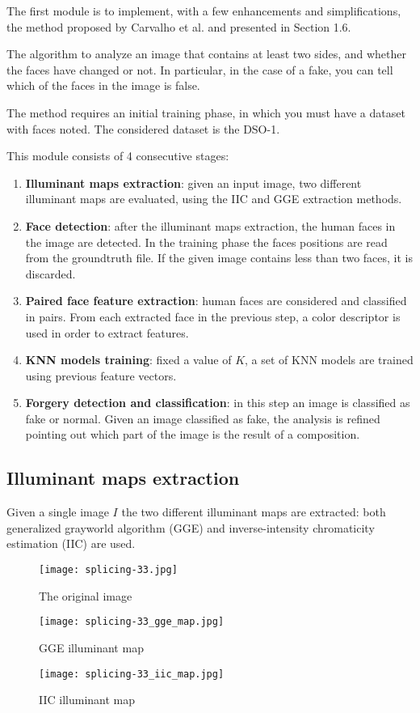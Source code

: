 The first module is to implement, with a few enhancements and simplifications, the method proposed by Carvalho et al. \cite{carvalho2016illuminant} and presented in Section 1.6.

The algorithm to analyze an image that contains at least two sides, and whether the faces have changed or not. In particular, in the case of a fake, you can tell which of the faces in the image is false.

The method requires an initial training phase, in which you must have a dataset with faces noted. The considered dataset is the DSO-1.

This module consists of 4 consecutive stages:

\begin{enumerate}
\item \textbf{Illuminant maps extraction}: given an input image, two different illuminant maps are evaluated, using the IIC and GGE extraction methods.
\item \textbf{Face detection}: after the illuminant maps extraction, the human faces in the image are detected. In the training phase the faces positions are read from the groundtruth file. If the given image contains less than two faces, it is discarded.
\item \textbf{Paired face feature extraction}: human faces are considered and classified in pairs. From each extracted face in the previous step, a color descriptor is used in order to extract features.
\item \textbf{KNN models training}: fixed a value of $K$, a set of KNN models are trained using previous feature vectors.
\item \textbf{Forgery detection and classification}: in this step an image is classified as fake or normal. Given an image classified as fake, the analysis is refined pointing out which part of the image is the result of a composition.
\end{enumerate}

\subsection{Illuminant maps extraction}

Given a single image $I$ the two different illuminant maps are extracted: both generalized grayworld algorithm (GGE) and inverse-intensity chromaticity estimation (IIC) are used.

\begin{figure}[!htb]
  \texttt{[image: splicing-33.jpg]}
  \caption{The original image}\label{fig:awesome_image1}
\endminipage\hfill
{}
  \texttt{[image: splicing-33\_gge\_map.jpg]}
  \caption{GGE illuminant map}\label{fig:awesome_image2}
\endminipage\hfill
{}%
  \texttt{[image: splicing-33\_iic\_map.jpg]}
  \caption{IIC illuminant map}\label{fig:awesome_image3}
\endminipage
\end{figure}

